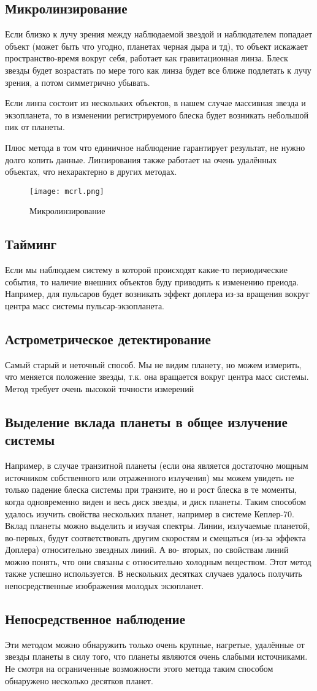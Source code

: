 \subsection{Микролинзирование}
Если близко к лучу зрения между наблюдаемой звездой и наблюдателем попадает объект (может быть что угодно, планетах черная дыра и тд), то объект искажает пространство-время вокруг себя, работает как гравитационная линза. Блеск звезды будет возрастать по мере того как линза будет все ближе подлетать к лучу зрения, а потом симметрично убывать.

 Если линза состоит из нескольких объектов, в нашем случае массивная звезда и экзопланета, то в изменении регистрируемого блеска будет возникать небольшой пик от планеты.

Плюс метода в том что единичное наблюдение гарантирует результат, не нужно долго копить данные. Линзирования также работает на очень удалённых объектах, что нехарактерно в других методах. 
\begin{figure}[H]
    \centering
    \texttt{[image: mcrl.png]}
    \caption{Микролинзирование}
    \label{fig:mcrl}
\end{figure}
\subsection{Тайминг}
Если мы наблюдаем систему в которой происходят какие-то периодические события, то наличие внешних объектов буду приводить к изменению преиода. Например, для пульсаров будет возникать эффект доплера из-за вращения вокруг центра масс системы пульсар-экзопланета.

\subsection{Астрометрическое детектирование}
Самый старый и неточный способ. Мы не видим планету, но можем измерить, что меняется положение звезды, т.к. она вращается вокруг центра масс системы. Метод требует очень высокой точности измерений 
\subsection{Выделение вклада планеты в общее излучение системы}
Например, в случае транзитной планеты (если она является достаточно мощным
 источником собственного или отраженного излучения) мы можем увидеть не только падение блеска системы при транзите, но и рост блеска в те моменты, когда одновременно виден и весь диск звезды, и диск планеты. Таким способом удалось изучить свойства нескольких планет, например в системе Кеплер-70. Вклад планеты можно выделить и изучая спектры. Линии, излучаемые планетой, во-первых, будут соответствовать другим скоростям и смещаться (из-за эффекта Доплера) относительно звездных линий. А во- вторых, по свойствам линий можно понять, что они связаны с относительно холодным веществом. Этот метод также успешно используется. В нескольких десятках случаев удалось получить непосредственные изображения молодых экзопланет.
\subsection{Непосредственное наблюдение}
Эти методом можно обнаружить только очень крупные, нагретые, удалённые от звезды планеты в силу того, что планеты являются очень слабыми источниками. Не смотря на ограниченные возможности этого метода таким способом обнаружено несколько десятков планет.
